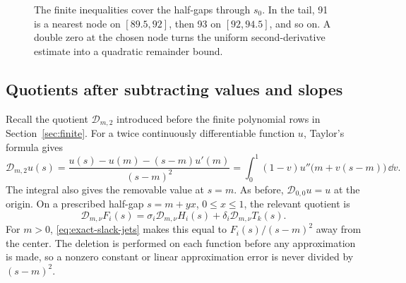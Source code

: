 \begin{figure}[htbp]
\centering
{}
\caption{The finite inequalities cover the half-gaps through \(s_0\).
In the tail, 91 is a nearest node on \([89.5,92]\), then 93 on
\([92,94.5]\), and so on.  A double zero at the chosen node turns the uniform
second-derivative estimate into a quadratic remainder bound.}
\label{fig:sign-junction}
\end{figure}

\subsection{Quotients after subtracting values and slopes}

Recall the quotient \(\mathcal D_{m,2}\) introduced before the finite
polynomial rows in Section~\ref{sec:finite}.  For a twice continuously
differentiable function \(u\), Taylor's formula gives
\[
 \mathcal D_{m,2}u(s)
 =\frac{u(s)-u(m)-(s-m)u'(m)}{(s-m)^2}
 =\int_0^1(1-v)u''\bigl(m+v(s-m)\bigr)\,\dd v.
\]
The integral also gives the removable value at \(s=m\).  As before,
\(\mathcal D_{0,0}u=u\) at the origin.  On a prescribed half-gap \(s=m+yx\),
\(0\le x\le1\), the relevant quotient is
\begin{equation}\label{eq:deleted-slack}
 \mathcal D_{m,\nu}F_i(s)
 =\sigma_i\mathcal D_{m,\nu}H_i(s)
  +\delta_i\mathcal D_{m,\nu}T_k(s).
\end{equation}
For \(m>0\), \eqref{eq:exact-slack-jets} makes this equal to
\(F_i(s)/(s-m)^2\) away from the center.  The deletion is performed on each
function before any approximation is made, so a nonzero constant or linear
approximation error is never divided by \((s-m)^2\).


